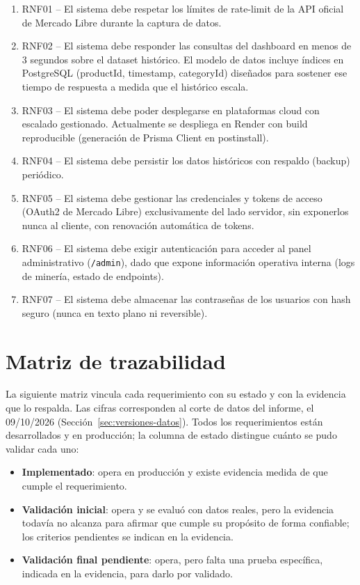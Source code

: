 \begin{enumerate}
	\item RNF01 -- El sistema debe respetar los límites de rate-limit de la API oficial de Mercado Libre durante la captura de datos.
	\item RNF02 -- El sistema debe responder las consultas del dashboard en menos de 3 segundos sobre el dataset histórico. El modelo de datos incluye índices en PostgreSQL (productId, timestamp, categoryId) diseñados para sostener ese tiempo de respuesta a medida que el histórico escala.
	\item RNF03 -- El sistema debe poder desplegarse en plataformas cloud con escalado gestionado. Actualmente se despliega en Render con build reproducible (generación de Prisma Client en postinstall).
	\item RNF04 -- El sistema debe persistir los datos históricos con respaldo (backup) periódico.
	\item RNF05 -- El sistema debe gestionar las credenciales y tokens de acceso (OAuth2 de Mercado Libre) exclusivamente del lado servidor, sin exponerlos nunca al cliente, con renovación automática de tokens.
	\item RNF06 -- El sistema debe exigir autenticación para acceder al panel administrativo (\texttt{/admin}), dado que expone información operativa interna (logs de minería, estado de endpoints).
	\item RNF07 -- El sistema debe almacenar las contraseñas de los usuarios con hash seguro (nunca en texto plano ni reversible).
\end{enumerate}

\section{Matriz de trazabilidad}\label{sec:trazabilidad}

La siguiente matriz vincula cada requerimiento con su estado y con la evidencia que lo respalda. Las cifras corresponden al corte de datos del informe, el 09/10/2026 (Sección~\ref{sec:versiones-datos}). Todos los requerimientos están desarrollados y en producción; la columna de estado distingue cuánto se pudo validar cada uno:

\begin{itemize}
	\item \textbf{Implementado}: opera en producción y existe evidencia medida de que cumple el requerimiento.
	\item \textbf{Validación inicial}: opera y se evaluó con datos reales, pero la evidencia todavía no alcanza para afirmar que cumple su propósito de forma confiable; los criterios pendientes se indican en la evidencia.
	\item \textbf{Validación final pendiente}: opera, pero falta una prueba específica, indicada en la evidencia, para darlo por validado.
\end{itemize}

